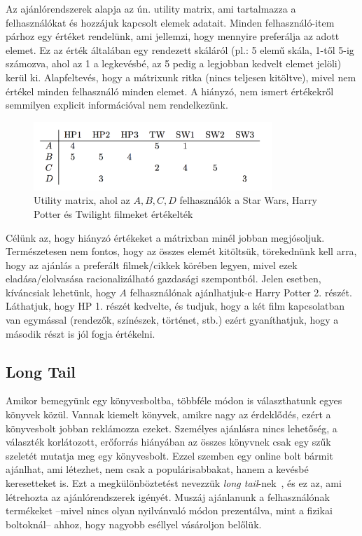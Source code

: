\documentclass[a4paper,12pt]{article}
\begin{document}
Az ajánlórendszerek alapja az ún. utility matrix, ami tartalmazza a felhasználókat és hozzájuk kapcsolt elemek adatait. Minden felhasználó-item párhoz egy értéket rendelünk, ami jellemzi, hogy mennyire preferálja az adott elemet. Ez az érték általában egy rendezett skáláról (pl.: 5 elemű skála, 1-től 5-ig számozva, ahol az 1 a legkevésbé, az 5 pedig a legjobban kedvelt elemet jelöli) kerül ki. Alapfeltevés, hogy a mátrixunk ritka (nincs teljesen kitöltve), mivel nem értékel minden felhasználó minden elemet. A hiányzó, nem ismert értékekről semmilyen explicit információval nem rendelkezünk.

\begin{figure}[ht!]
\centering
\includegraphics[width=90mm]{img/um.png}
\caption{Utility matrix, ahol az $A,B, C, D$ felhasználók a Star Wars, Harry Potter és Twilight filmeket értékelték \label{overflow}}
\end{figure}

Célünk az, hogy hiányzó értékeket a mátrixban minél jobban megjósoljuk. Természetesen nem fontos, hogy az összes elemét kitöltsük, törekednünk kell arra, hogy az ajánlás a preferált filmek/cikkek körében legyen, mivel ezek eladása/elolvasása racionalizálható gazdasági szempontból. Jelen esetben, kíváncsiak lehetünk, hogy $A$ felhasználónak ajánlhatjuk-e Harry Potter 2. részét. Láthatjuk, hogy HP 1. részét kedvelte, és tudjuk, hogy a két film kapcsolatban van egymással (rendezők, színészek, történet, stb.) ezért gyaníthatjuk, hogy a második részt is jól fogja értékelni.

\subsection{Long Tail}

Amikor bemegyünk egy könyvesboltba, többféle módon is választhatunk egyes könyvek közül. Vannak kiemelt könyvek, amikre nagy az érdeklődés, ezért a könyvesbolt jobban reklámozza ezeket. Személyes ajánlásra nincs lehetőség, a választék korlátozott, erőforrás hiányában az összes könyvnek csak egy szűk szeletét mutatja meg egy könyvesbolt. Ezzel szemben egy online bolt bármit ajánlhat, ami létezhet, nem csak a populárisabbakat, hanem a kevésbé keresetteket is. Ezt a megkülönböztetést nevezzük \textsl{long tail}-nek~\cite{longtail}, és ez az, ami létrehozta az ajánlórendszerek igényét. Muszáj ajánlanunk a felhasználónak termékeket --mivel nincs olyan nyilvánvaló módon prezentálva, mint a fizikai boltoknál-- ahhoz, hogy nagyobb eséllyel vásároljon belőlük.
\end{document}

